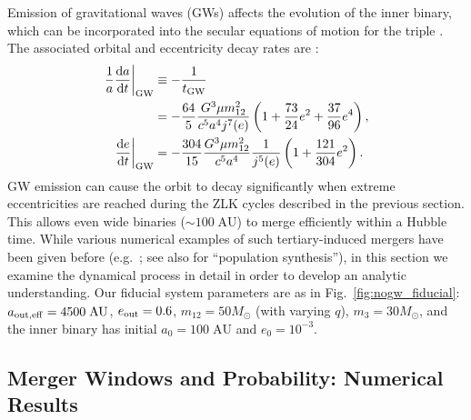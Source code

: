 \documentclass[
        fleqn,
        usenatbib,
    ]{mnras}
\newcommand*{\rd}[2]{\frac{\mathrm{d}#1}{\mathrm{d}#2}}
\newcommand*{\at}[1]{\left.#1\right|}
\newcommand*{\p}[1]{\left(#1\right)}
\begin{document}
Emission of gravitational waves (GWs) affects the evolution of the inner
binary, which can be incorporated into the secular equations of motion for the
triple \citep[e.g.,]{peters1964, LL18}. The associated orbital and eccentricity
decay rates are \citep{peters1964}:
\begin{align}
    \at{\frac{1}{a}\rd{a}{t}}_{\rm GW} &\equiv -\frac{1}{t_{\rm GW}}\nonumber\\
        &= -\frac{64}{5}\frac{G^3 \mu m_{12}^2}{c^5a^4j^7(e)}
            \p{1 + \frac{73}{24}e^2 + \frac{37}{96}e^4}\label{eq:def_tgw},\\
    \at{\rd{e}{t}}_{\rm GW} &= -\frac{304}{15}\frac{G^3 \mu m_{12}^2}{c^5a^4}
        \frac{1}{j^{5}(e)}\p{1 + \frac{121}{304}e^2}\label{eq:dedt_gw}.
\end{align}
GW emission can cause the orbit to decay significantly when extreme
eccentricities are reached during the ZLK cycles described in the previous
section. This allows even wide binaries ($\sim 100\;\mathrm{AU}$) to merge
efficiently within a Hubble time. While various numerical examples of such
tertiary-induced mergers have been given before (e.g.\ \citet{LL18}; see also
\citet{LL19} for ``population synthesis''), in this section we examine the
dynamical process in detail in order to develop an analytic understanding.
Our fiducial system parameters are as in Fig.~\ref{fig:nogw_fiducial}:
$a_{\rm out, eff} = 4500\;\mathrm{AU}$, $e_{\rm out} =
0.6$, $m_{12} = 50M_{\odot}$ (with varying $q$), $m_3 = 30M_{\odot}$, and the
inner binary has initial $a_0 = 100\;\mathrm{AU}$ and $e_0 = 10^{-3}$.

\subsection{Merger Windows and Probability: Numerical Results}\label{ss:windows}
\end{document}
